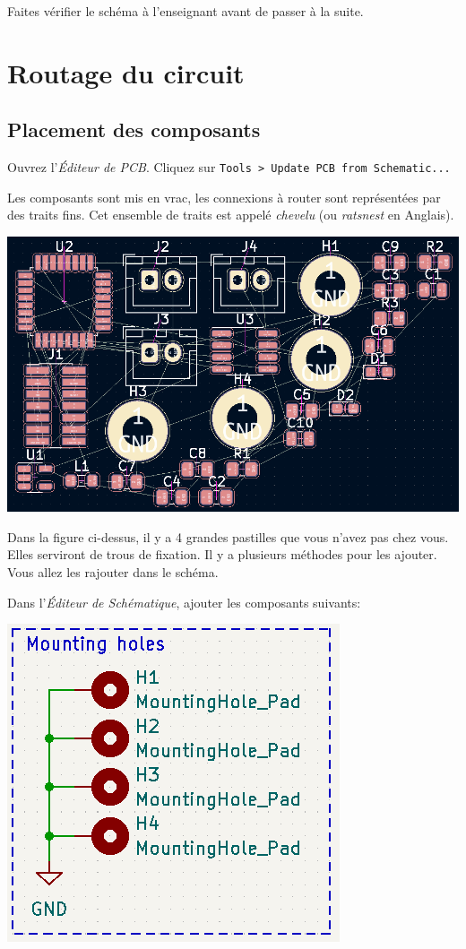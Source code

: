 \documentclass[12pt,%
addpoints,%
]{exam}
\begin{document}
Faites vérifier le schéma à l'enseignant avant de passer à la suite.

\newpage

\section{Routage du circuit}
\subsection{Placement des composants}
\begin{questions}
	\question Ouvrez l'\emph{Éditeur de PCB}.
	\question Cliquez sur \texttt{Tools > Update PCB from Schematic...}

	Les composants sont mis en vrac, les connexions à router sont représentées par des traits fins.
	Cet ensemble de traits est appelé \emph{chevelu} (ou \emph{ratsnest} en Anglais).

	\begin{center}
        \includegraphics[width=.8\linewidth]{figures/kicad18.png}
    \end{center}

	Dans la figure ci-dessus, il y a 4 grandes pastilles que vous n'avez pas chez vous. 
	Elles serviront de trous de fixation. Il y a plusieurs méthodes pour les ajouter.
	Vous allez les rajouter dans le schéma.

	\question Dans l'\emph{Éditeur de Schématique}, ajouter les composants suivants:

	\begin{center}
        \includegraphics[scale=0.5]{figures/kicad19.png}
    \end{center}


\end{questions}
\end{document}
